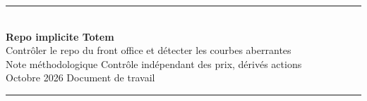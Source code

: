 \thispagestyle{plain}
\begin{center}
{\color{accentdark}\rule{\linewidth}{0.8pt}}\\[10pt]
{\LARGE\bfseries Repo implicite Totem}\\[6pt]
{\large Contrôler le repo du front office et détecter les courbes aberrantes}\\[8pt]
{\normalsize\color{ink2} Note méthodologique \quad\textbullet\quad Contrôle indépendant des prix, dérivés
actions}\\[2pt]
{\normalsize\color{ink2} Octobre 2026 \quad\textbullet\quad Document de travail}\\[4pt]
{\color{accentdark}\rule{\linewidth}{0.8pt}}
\end{center}

